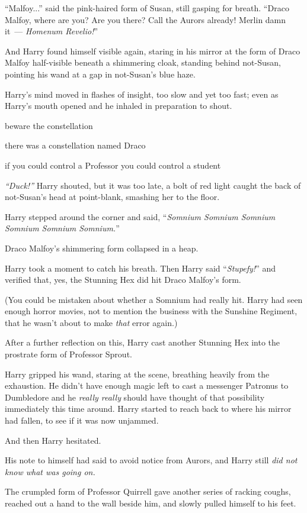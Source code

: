 ``Malfoy...'' said the pink-haired form of Susan, still gasping for breath. ``Draco Malfoy, where are you? Are you there? Call the Aurors already! Merlin damn it~--- \emph{Homenum Revelio!}''

And Harry found himself visible again, staring in his mirror at the form of Draco Malfoy half-visible beneath a shimmering cloak, standing behind not-Susan, pointing his wand at a gap in not-Susan's blue haze.

Harry's mind moved in flashes of insight, too slow and yet too fast; even as Harry's mouth opened and he inhaled in preparation to shout.

beware the constellation

there was a constellation named Draco

if you could control a Professor you could control a student

\emph{``Duck!''} Harry shouted, but it was too late, a bolt of red light caught the back of not-Susan's head at point-blank, smashing her to the floor.

Harry stepped around the corner and said, ``\emph{Somnium Somnium Somnium Somnium Somnium Somnium.}''

Draco Malfoy's shimmering form collapsed in a heap.

Harry took a moment to catch his breath. Then Harry said ``\emph{Stupefy!}'' and verified that, yes, the Stunning Hex did hit Draco Malfoy's form.

(You could be mistaken about whether a Somnium had really hit. Harry had seen enough horror movies, not to mention the business with the Sunshine Regiment, that he wasn't about to make \emph{that} error again.)

After a further reflection on this, Harry cast another Stunning Hex into the prostrate form of Professor Sprout.

Harry gripped his wand, staring at the scene, breathing heavily from the exhaustion. He didn't have enough magic left to cast a messenger Patronus to Dumbledore and he \emph{really really} should have thought of that possibility immediately this time around. Harry started to reach back to where his mirror had fallen, to see if it was now unjammed.

And then Harry hesitated.

His note to himself had said to avoid notice from Aurors, and Harry still \emph{did not know what was going on.}

The crumpled form of Professor Quirrell gave another series of racking coughs, reached out a hand to the wall beside him, and slowly pulled himself to his feet.

